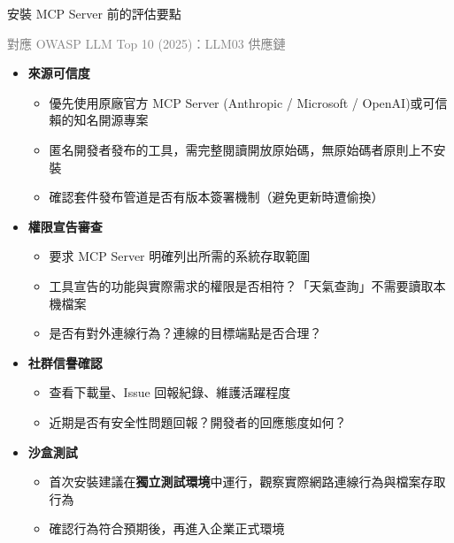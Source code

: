 \documentclass[aspectratio=1610]{Common/MyCourseBeamer}
\begin{document}
\begin{frame}[allowframebreaks=0.85]{安裝 MCP Server 前的評估要點}

	{\scriptsize\textcolor{gray}{對應 OWASP LLM Top 10 (2025)：LLM03 供應鏈}}\vspace{0.3em}

	\begin{itemize}
		\item \textbf{來源可信度}
			\begin{itemize}
				\item 優先使用原廠官方 MCP Server (Anthropic / Microsoft / OpenAI)或可信賴的知名開源專案
				\item 匿名開發者發布的工具，需\alert{完整閱讀開放原始碼}，無原始碼者原則上不安裝
				\item 確認套件發布管道是否有版本簽署機制（避免更新時遭偷換）
			\end{itemize}

		\item \textbf{權限宣告審查}
			\begin{itemize}
				\item 要求 MCP Server 明確列出所需的系統存取範圍
				\item 工具宣告的功能與實際需求的權限是否相符？「天氣查詢」不需要讀取本機檔案
				\item 是否有對外連線行為？連線的目標端點是否合理？
			\end{itemize}

		\framebreak
		\item \textbf{社群信譽確認}
			\begin{itemize}
				\item 查看下載量、Issue 回報紀錄、維護活躍程度
				\item 近期是否有安全性問題回報？開發者的回應態度如何？
			\end{itemize}

		\item \textbf{沙盒測試}
			\begin{itemize}
				\item 首次安裝建議在\textbf{獨立測試環境}中運行，觀察實際網路連線行為與檔案存取行為
				\item 確認行為符合預期後，再進入企業正式環境
			\end{itemize}
	\end{itemize}

\end{frame}
\end{document}

